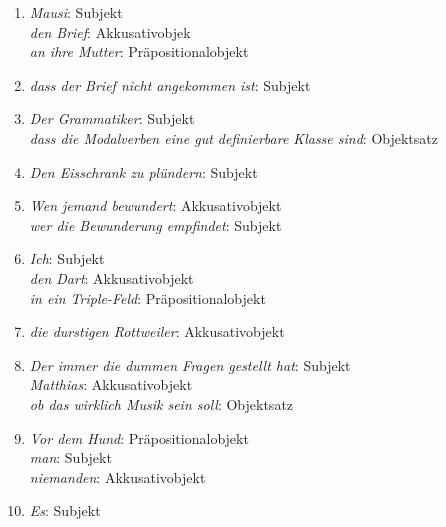 \begin{enumerate}\Lf
  \item \textit{Mausi}: Subjekt\\
    \textit{den Brief}: Akkusativobjek\\
    \textit{an ihre Mutter}: Präpositionalobjekt
  \item \textit{dass der Brief nicht angekommen ist}: Subjekt
  \item \textit{Der Grammatiker}: Subjekt\\
    \textit{dass die Modalverben eine gut definierbare Klasse sind}: Objektsatz
  \item \textit{Den Eisschrank zu plündern}: Subjekt
  \item \textit{Wen jemand bewundert}: Akkusativobjekt\\
    \textit{wer die Bewunderung empfindet}: Subjekt
  \item \textit{Ich}: Subjekt\\
    \textit{den Dart}: Akkusativobjekt\\
    \textit{in ein Triple-Feld}: Präpositionalobjekt
  \item \textit{die durstigen Rottweiler}: Akkusativobjekt
  \item \textit{Der immer die dummen Fragen gestellt hat}: Subjekt\\
    \textit{Matthias}: Akkusativobjekt\\
    \textit{ob das wirklich Musik sein soll}: Objektsatz 
  \item \textit{Vor dem Hund}: Präpositionalobjekt\\
    \textit{man}: Subjekt\\
    \textit{niemanden}: Akkusativobjekt
  \item \textit{Es}: Subjekt
\end{enumerate}


